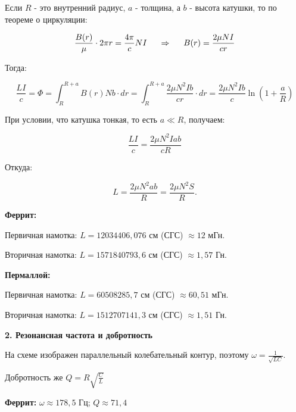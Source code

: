 \documentclass[a4paper,12pt]{article} %
\begin{document}
Если $R$ - это внутренний радиус, $a$ - толщина, а $b$ - высота катушки, то по теореме о циркуляции:

\begin{equation*}
	\frac{B(r)}{\mu}\cdot 2\pi r = \frac{4\pi}{c}NI \hspace{5mm} \Rightarrow \hspace{5mm} B(r) = \frac{2\mu NI}{cr}
\end{equation*}

Тогда:

\begin{equation*}
	\frac{LI}{c} = \Phi = \int_{R}^{R+a} B(r)Nb \cdot dr = \int_{R}^{R+a} \frac{2\mu N^2 Ib}{cr} \cdot dr = \frac{2\mu N^2Ib}{c}\ln\left(1+\frac{a}{R}\right) 
\end{equation*}

При условии, что катушка тонкая, то есть $a \ll R$, получаем:

\begin{equation*}
	\frac{LI}{c} = \frac{2\mu N^2 Iab}{cR}
\end{equation*}

Откуда:

\begin{equation*}
	L = \frac{2\mu N^2ab}{R} = \frac{2\mu N^2S}{R}.
\end{equation*}

\vspace{5mm}
\textbf{Феррит:} 

Первичная намотка: $L = 12034406,076$ см (СГС) $\approx 12$ мГн.

Вторичная намотка: $L = 1571840793,6$ см (СГС) $\approx 1,57 $ Гн.

\textbf{Пермаллой:} 

Первичная намотка: $L = 60508285,7$ см (СГС) $\approx 60,51$ мГн.

Вторичная намотка: $L = 1512707141,3$ см (СГС) $\approx 1,51$ Гн.



\textbf{{\large 2. Резонансная частота и добротность}}

На схеме изображен параллельный колебательный контур, поэтому $\omega = \frac{1}{\sqrt{LC}}.$ 

Добротность же $Q = R\sqrt{\frac{C}{L}}$

\vspace{5mm}
\textbf{Феррит:} $\omega\approx 178,5$ Гц; $Q \approx 71,4$

\vspace{5mm}
\end{document}
